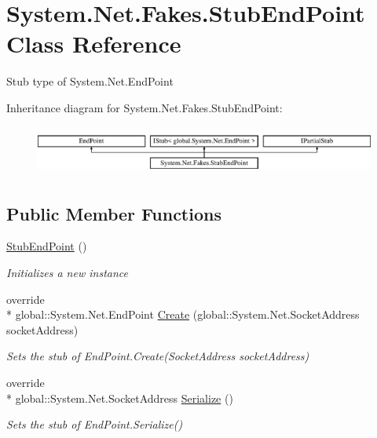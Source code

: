 \hypertarget{class_system_1_1_net_1_1_fakes_1_1_stub_end_point}{\section{System.\-Net.\-Fakes.\-Stub\-End\-Point Class Reference}
\label{class_system_1_1_net_1_1_fakes_1_1_stub_end_point}
}


Stub type of System.\-Net.\-End\-Point 


Inheritance diagram for System.\-Net.\-Fakes.\-Stub\-End\-Point\-:\begin{figure}[H]
\begin{center}
\leavevmode
\includegraphics[height=1.644640cm]{class_system_1_1_net_1_1_fakes_1_1_stub_end_point}
\end{center}
\end{figure}
\subsection*{Public Member Functions}
\begin{DoxyCompactItemize}
\item 
\hyperlink{class_system_1_1_net_1_1_fakes_1_1_stub_end_point_a709761f8d2f8d5c1244258b39e5fc594}{Stub\-End\-Point} ()
\begin{DoxyCompactList}\small\item\em Initializes a new instance\end{DoxyCompactList}\item 
override \\*
global\-::\-System.\-Net.\-End\-Point \hyperlink{class_system_1_1_net_1_1_fakes_1_1_stub_end_point_a2cf052b313dc0326f5edf51e14dcf370}{Create} (global\-::\-System.\-Net.\-Socket\-Address socket\-Address)
\begin{DoxyCompactList}\small\item\em Sets the stub of End\-Point.\-Create(\-Socket\-Address socket\-Address)\end{DoxyCompactList}\item 
override \\*
global\-::\-System.\-Net.\-Socket\-Address \hyperlink{class_system_1_1_net_1_1_fakes_1_1_stub_end_point_a6aee45ecc9dc1ba92820e40b7a5c5230}{Serialize} ()
\begin{DoxyCompactList}\small\item\em Sets the stub of End\-Point.\-Serialize()\end{DoxyCompactList}\end{DoxyCompactItemize}
